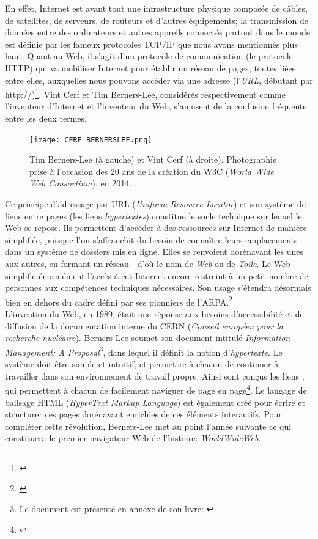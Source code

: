 \documentclass[a4paper,12pt,twoside]{book}
\begin{document}
En effet, Internet est avant tout une infrastructure physique composée de câbles, de satellites, de serveurs, de routeurs et d'autres équipements; la transmission de données entre des ordinateurs et autres appreils connectés partout dans le monde est définie par les fameux protocoles TCP/IP que nous avons mentionnés plus haut. Quant au Web, il s'agit d'un \og protocole de communication \fg{} (le protocole HTTP) qui va mobiliser Internet pour établir un réseau de pages, toutes liées entre elles, auxquelles nous pouvons accéder via une adresse (l'\textit{URL}, débutant par \og http://\fg{})\footnote{\cite[p.~27-28]{cardonCultureNumerique2019}}. Vint Cerf et Tim Berners-Lee, considérés respectivement comme l'inventeur d'Internet et l'inventeur du Web, s'amusent de la confusion fréquente entre les deux termes.\\
\begin{figure}[h]
    \centering
    \texttt{[image: CERF\_BERNERSLEE.png]}
    \caption{Tim Berners-Lee (à gauche) et Vint Cerf (à droite). Photographie prise à l'occasion des 20 ans de la création du W3C (\textit{World Wide Web Consortium}), en 2014.}
    \label{fig:enter-label}
\end{figure}

Ce principe d'adressage par URL (\textit{Uniform Resource Locator}) et son système de liens entre pages (les liens \textit{hypertextes}) constitue le socle technique sur lequel le Web se repose. Ils permettent d'accéder à des ressources sur Internet de manière simplifiée, puisque l'on s'affranchit du besoin de connaître leurs emplacements dans un système de dossiers mis en ligne. Elles se renvoient dorénavant les unes aux autres, en formant un réseau - d'où le nom de \textit{Web} ou de \textit{Toile}. Le Web simplifie énormément l'accès à cet Internet encore restreint à un petit nombre de personnes aux compétences techniques nécessaires. Son usage s'étendra désormais bien en dehors du cadre défini par ses pionniers de l'ARPA.\footnote{\cite[p.~80-86]{cardonCultureNumerique2019}}\\

L'invention du Web, en 1989, était une réponse aux besoins d'accessibilité et de diffusion de la documentation interne du CERN (\textit{Conseil européen pour la recherche nucléaire}). Berners-Lee soumet son document intitulé \textit{Information Management: A Proposal}\footnote{Le document est présenté en annexe de son livre: \cite[p. 211-229]{berners-leeWeavingWebOriginal2000}}, dans lequel il définit la notion d'\textit{hypertexte}. Le système doit être simple et intuitif, et permettre à chacun de continuer à travailler dans son environnement de travail propre. Ainsi sont conçus les \og liens \fg, qui permettent à chacun de facilement naviguer de page en page\footnote{\cite[p.~18-20]{berners-leeWeavingWebOriginal2000}}. Le langage de balisage HTML (\textit{HyperText Markup Language}) est également créé pour écrire et structurer ces pages dorénavant enrichies de ces éléments interactifs. Pour compléter cette révolution, Berners-Lee met au point l'année suivante ce qui constituera le premier navigateur Web de l'histoire: \textit{WorldWideWeb}.\\
\end{document}
